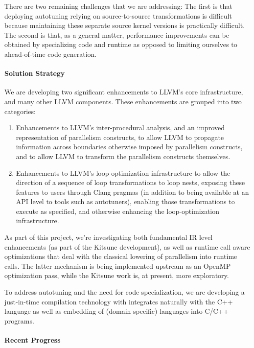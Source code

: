 There are two remaining challenges that we are addressing: The first is that deploying autotuning relying on source-to-source transformations is difficult because maintaining these separate source kernel versions is practically difficult. The second is that, as a general matter, performance improvements can be obtained by specializing code and runtime as opposed to limiting ourselves to ahead-of-time code generation.

\paragraph{Solution Strategy}
We are developing two significant enhancements to LLVM's core infrastructure, and many other LLVM components. These enhancements are grouped into two categories:
\begin{enumerate}
\item Enhancements to LLVM's inter-procedural analysis, and an improved representation of parallelism constructs, to allow LLVM to propagate information across boundaries otherwise imposed by parallelism constructs, and to allow LLVM to transform the parallelism constructs themselves.
\item Enhancements to LLVM's loop-optimization infrastructure to allow the direction of a sequence of loop transformations to loop nests, exposing these features to users through Clang pragmas (in addition to being available at an API level to tools such as autotuners), enabling those transformations to execute as specified, and otherwise enhancing the loop-optimization infrastructure.
\end{enumerate}

As part of this project, we're investigating both fundamental 
IR level enhancements (as part of the Kitsune development), as
well as runtime call aware optimizations that deal with the classical lowering
of parallelism into runtime calls. The latter mechanism is being implemented
upstream as an OpenMP optimization pass, while the Kitsune work is, at present,
more exploratory.

To address autotuning and the need for code specialization, we are developing a just-in-time compilation technology with integrates naturally with the C++ language as well as embedding of (domain specific) languages into C/C++ programs.

\paragraph{Recent Progress}

